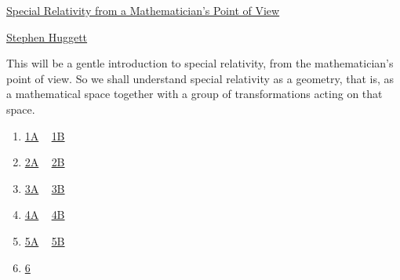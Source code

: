 \documentclass[11pt]{article}
\begin{document}
	\kaishu 
	\setcounter{section}{0}
	\begin{center}
		{\LARGE  \href{https://www.youtube.com/playlist?list=PL-VAZnoQqQ4UTh4o364M_9534SCAY4dl_}{Special Relativity from a Mathematician's Point of View }}
		
		
		{\large \href{http://stephenhuggett.com/}{Stephen Huggett}}
	\end{center}
\setcounter{page}{1}


This will be a gentle introduction to special relativity, from the mathematician's point of view. So we shall understand special relativity as a geometry, that is, as a mathematical space together with a group of transformations acting on that space.

\begin{multicols}{6}
	\begin{enumerate}
		\item \href{https://mp.weixin.qq.com/s/6ehoB_7Yyy-ZaqCWFGAchQ}{1A}  ~ \href{https://mp.weixin.qq.com/s/5hbdaDUWvp2Fgk7lZPA5cA}{1B}	%
		\item \href{https://mp.weixin.qq.com/s/cFDdSuZ4Ptse5psUu8BX0w}{2A}  ~ \href{https://mp.weixin.qq.com/s/fDKW3byM8M4q9Ee0ElcWNw}{2B}	%
		\item \href{https://mp.weixin.qq.com/s/9BMkJ_PeqNB8jVXPiJ9GQg}{3A}  ~ \href{https://mp.weixin.qq.com/s/Bl0GHkqHirUXPsEPNAlR6Q}{3B}	%
		\item \href{https://mp.weixin.qq.com/s/A00dIgYnozVogvf3GK6zoQ}{4A}  ~ \href{https://mp.weixin.qq.com/s/XPCjhfQNpg1aXtTJPWQLsA}{4B}	%
		\item \href{https://mp.weixin.qq.com/s/mF7hUutQ3uTWp6AFS-kn0A}{5A}  ~ \href{https://mp.weixin.qq.com/s/rkiDKobJ0-jkIbakYFTehg}{5B}	%
		\item \href{https://mp.weixin.qq.com/s/_Wx3N1eFNIqPTvdn-rkqsQ}{6}	%
	\end{enumerate}
\end{multicols}
\end{document}
